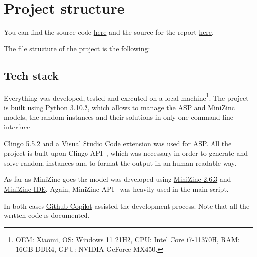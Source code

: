 \section{Project structure}
You can find the source code \href{https://github.com/pinzauti/automated-reasoning}{here} and the source for the report \href{https://github.com/pinzauti/automated-reasoning-report}{here}.

The file structure of the project is the following:

\subsection{Tech stack}

Everything was developed, tested and executed on a local machine\footnote{OEM: Xiaomi, OS: Windows 11 21H2, CPU: Intel Core i7-11370H, RAM: 16GB DDR4, GPU: NVIDIA GeForce MX450.}. The project is built using \href{https://www.python.org/downloads/release/python-3102/}{Python 3.10.2}, which allows to manage the ASP and MiniZinc models, the random instances and their solutions in only one command line interface.

\href{https://github.com/potassco/clingo/releases/tag/v5.5.2}{Clingo 5.5.2} and a \href{https://marketplace.visualstudio.com/items?itemName=abelcour.asp-syntax-highlight}{Visual Studio Code extension} was used for ASP. All the project is built upon Clingo API~\cite{ClingoAPI}, which was necessary in order to generate and solve random instances and to format the output in an human readable way.

As far as MiniZinc goes the model was developed using \href{https://github.com/MiniZinc/libminizinc/releases/tag/2.6.3}{MiniZinc 2.6.3} and \href{https://www.minizinc.org/ide/}{MiniZinc IDE}. Again, MiniZinc API~\cite{MiniZincPython} was heavily used in the main script.

In both cases \href{https://copilot.github.com/}{Github Copilot} assisted the development process.
Note that all the written code is documented.

